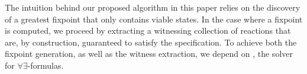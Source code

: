 The intuition behind our proposed algorithm in this paper relies on the
discovery of a greatest fixpoint that only contains viable states. In the case where a fixpoint is computed, we proceed by extracting a witnessing collection of reactions that are, by construction, guaranteed to satisfy the specification. To achieve both the fixpoint generation, as well as the witness extraction, we depend on \aeval, the solver for $\forall\exists$-formulas.


